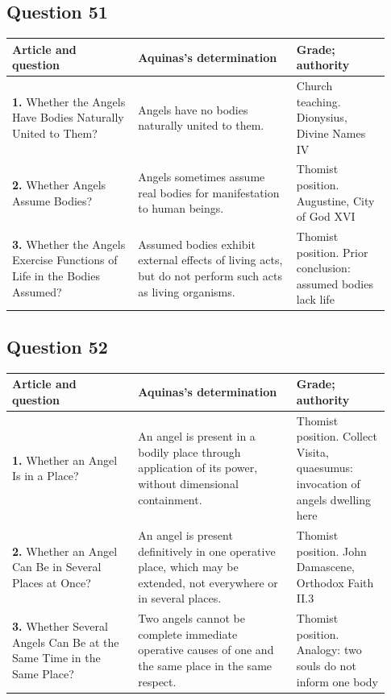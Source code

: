 \subsection{Question 51}
\begin{longtable}{@{}>{\raggedright\arraybackslash}p{0.31\linewidth}>{\raggedright\arraybackslash}p{0.39\linewidth}>{\raggedright\arraybackslash}p{0.23\linewidth}@{}}
\toprule
Article and question & Aquinas's determination & Grade; authority\\
\midrule\endhead
\textbf{1.} Whether the Angels Have Bodies Naturally United to Them? & Angels have no bodies naturally united to them. & Church teaching. Dionysius, Divine Names IV\\
\textbf{2.} Whether Angels Assume Bodies? & Angels sometimes assume real bodies for manifestation to human beings. & Thomist position. Augustine, City of God XVI\\
\textbf{3.} Whether the Angels Exercise Functions of Life in the Bodies Assumed? & Assumed bodies exhibit external effects of living acts, but do not perform such acts as living organisms. & Thomist position. Prior conclusion: assumed bodies lack life\\
\bottomrule
\end{longtable}
\subsection{Question 52}
\begin{longtable}{@{}>{\raggedright\arraybackslash}p{0.31\linewidth}>{\raggedright\arraybackslash}p{0.39\linewidth}>{\raggedright\arraybackslash}p{0.23\linewidth}@{}}
\toprule
Article and question & Aquinas's determination & Grade; authority\\
\midrule\endhead
\textbf{1.} Whether an Angel Is in a Place? & An angel is present in a bodily place through application of its power, without dimensional containment. & Thomist position. Collect Visita, quaesumus: invocation of angels dwelling here\\
\textbf{2.} Whether an Angel Can Be in Several Places at Once? & An angel is present definitively in one operative place, which may be extended, not everywhere or in several places. & Thomist position. John Damascene, Orthodox Faith II.3\\
\textbf{3.} Whether Several Angels Can Be at the Same Time in the Same Place? & Two angels cannot be complete immediate operative causes of one and the same place in the same respect. & Thomist position. Analogy: two souls do not inform one body\\
\bottomrule
\end{longtable}
